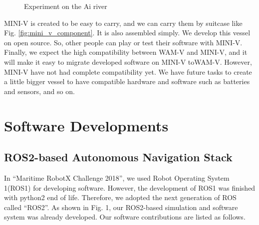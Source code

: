 \documentclass[lettersize,journal]{IEEEtran}
\begin{document}
\begin{figure}[h]
    \begin{center}
    \end{center}
    \caption{Experiment on the Ai river}
    \label{fig:mini_v_experiment}
  \end{figure}

MINI-V is created to be easy to carry, and we can carry them by suitcase like Fig. \ref{fig:mini_v_component}.
It is also assembled simply. We develop this vessel on open source. So, other people can play or test their software with MINI-V. Finally,
we expect the high compatibility between WAM-V and MINI-V, and it will make it easy to migrate developed software on MINI-V toWAM-V. However, 
MINI-V have not had complete compatibility yet.
We have future tasks to create a little bigger vessel to have compatible hardware and software such as batteries and sensors, and so on.

\section{Software Developments}
\subsection{ROS2-based Autonomous Navigation Stack}
In “Maritime RobotX Challenge 2018”, we used Robot Operating System 1(ROS1) for developing software.
However, the development of ROS1 was finished with python2 end of life.
Therefore, we adopted the next generation of ROS called “ROS2”.
As shown in Fig. 1, our ROS2-based simulation and software system was already developed.
Our software contributions are listed as follows.
\end{document}
